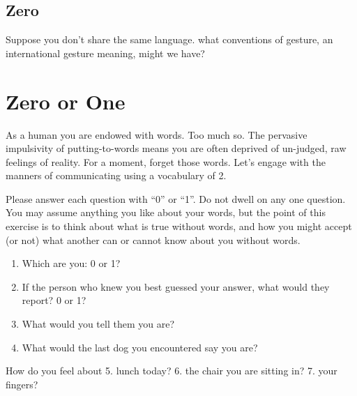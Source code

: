 \documentclass[
]{book}
\providecommand{\tightlist}{%
  \setlength{\itemsep}{0pt}\setlength{\parskip}{0pt}}
\begin{document}
\hypertarget{zero}{%
\section{Zero}\label{zero}}

Suppose you don't share the same language. what conventions of gesture, an international gesture meaning, might we have?

\hypertarget{appendix-lessons}{%
\appendix}


\hypertarget{zero-or-one}{%
\chapter{Zero or One}\label{zero-or-one}}

As a human you are endowed with words.
Too much so. The pervasive impulsivity of putting-to-words means you are often deprived
of un-judged, raw feelings of reality.
For a moment, forget those words.
Let's engage with the manners of communicating
using a vocabulary of 2.

Please answer each question with ``0'' or ``1''.
Do not dwell on any one question.
You may assume anything you like about your words,
but the point of this exercise is to think about what is true without words, and how you might accept (or not)
what another can or cannot know about you without words.

\begin{enumerate}
\def\labelenumi{\arabic{enumi}.}
\tightlist
\item
  Which are you: 0 or 1?
\item
  If the person who knew you best guessed your answer,
  what would they report? 0 or 1?
\item
  What would you tell them you are?
\item
  What would the last dog you encountered say you are?
\end{enumerate}

How do you feel about
5. lunch today?
6. the chair you are sitting in?
7. your fingers?
\end{document}
